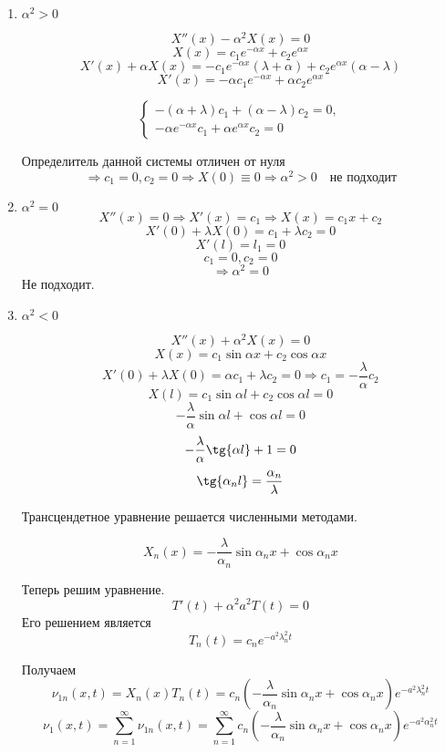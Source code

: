 \begin{enumerate}[label=\arabic*)]
\item $\alpha^{2} > 0$

$$ X''(x) - \alpha^{2}X(x) = 0 $$
$$ X(x) = c_{1}e^{-\alpha x} + c_{2}e^{\alpha x} $$
$$ X'(x) + \alpha X(x) = -c_{1}e^{-\alpha x}(\lambda + \alpha) + c_{2}e^{\alpha x} (\alpha - \lambda)$$
$$ X'(x) = -\alpha c_{1}e^{-\alpha x} + \alpha c_{2}e^{\alpha x}$$

$$
\begin{cases}
-(\alpha + \lambda)c_{1} + (\alpha - \lambda)c_{2} = 0,\\
-\alpha e^{-\alpha x}c_{1} + \alpha e^{\alpha x} c_{2} = 0
\end{cases}
$$

Определитель данной системы отличен от нуля
$$ \Rightarrow c_{1} = 0, c_{2} = 0 \Rightarrow X(0) \equiv 0 \Rightarrow \alpha^{2} > 0 \quad \text{не подходит}$$

\item $\alpha^{2} = 0$
$$ X''(x) = 0 \Rightarrow X'(x) = c_{1} \Rightarrow X(x) = c_{1}x + c_{2} $$
$$ X'(0) + \lambda X(0) = c_{1} + \lambda c_{2} = 0 $$
$$ X'(l) = l_{1} = 0$$
$$c_{1} = 0, c_{2} = 0 $$
$$ \Rightarrow \alpha^{2} = 0$$
Не подходит.

\item $\alpha^{2} < 0$

$$ X''(x) + \alpha^{2}X(x) = 0 $$
$$ X(x) = c_{1}\sin{\alpha x} + c_{2}\cos{\alpha x} $$
$$ X'(0) + \lambda X(0) = \alpha c_{1} + \lambda c_{2} = 0 \Rightarrow c_{1} = -\dfrac{\lambda}{\alpha}c_{2} $$
$$ X(l) = c_{1}\sin{\alpha l} + c_{2}\cos{\alpha l} = 0 $$
$$ -\dfrac{\lambda}{\alpha} \sin{\alpha l} + \cos{\alpha l} = 0$$
$$ -\dfrac{\lambda}{\alpha} \tg{\alpha l} + 1 = 0 $$
$$ \tg{\alpha_{n} l} = \dfrac{\alpha_{n}}{\lambda} $$

Трансцендетное уравнение решается численными методами.

$$ X_{n}(x) = -\dfrac{\lambda}{\alpha_{n}} \sin{\alpha_{n} x} + \cos{\alpha_{n} x}$$

Теперь решим уравнение.
$$ T'(t) + \alpha^{2}a^{2}T(t) = 0 $$
Его решением является
$$ T_{n}(t) = c_{n}e^{-a^{2}\lambda_{n}^{2}t} $$

Получаем
$$ \nu_{1n}(x, t) = X_{n}(x)T_{n}(t) = c_{n} \left( -\dfrac{\lambda}{\alpha_{n}} \sin{\alpha_{n}x} + \cos{\alpha_{n}x} \right)e^{-a^{2}\lambda_{n}^{2}t} $$
$$ \nu_{1}(x, t) = \sum_{n=1}^{\infty} \nu_{1n}(x, t) = \sum_{n=1}^{\infty} c_{n} \left( -\dfrac{\lambda}{\alpha_{n}} \sin{\alpha_{n}x} + \cos{\alpha_{n}x} \right)e^{-a^{2}\alpha_{n}^{2}t} $$


\end{enumerate}
